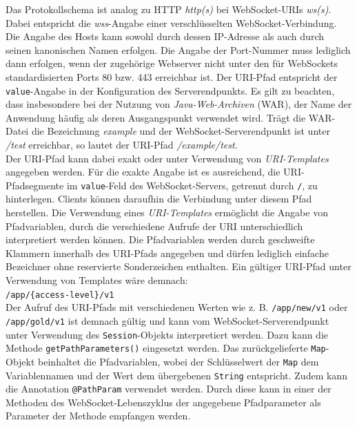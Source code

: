\documentclass[11pt,a4paper,titlepage]{scrartcl}
\numberwithin{equation}{section}
\begin{document}
\noindent Das Protokollschema ist analog zu HTTP \textit{http(s)} bei WebSocket-URIs \textit{ws(s)}. Dabei entspricht die \textit{wss}-Angabe einer verschlüsselten WebSocket-Verbindung. Die Angabe des Hosts kann sowohl durch dessen IP-Adresse als auch durch seinen kanonischen Namen erfolgen. Die Angabe der Port-Nummer muss lediglich dann erfolgen, wenn der zugehörige Webserver nicht unter den für WebSockets standardisierten Ports 80 bzw. 443 erreichbar ist. Der URI-Pfad entspricht der \texttt{value}-Angabe in der Konfiguration des Serverendpunkts. Es gilt zu beachten, dass insbesondere bei der Nutzung von \textit{Java-Web-Archiven} (WAR), der Name der Anwendung häufig als deren Ausgangspunkt verwendet wird. Trägt die WAR-Datei die Bezeichnung \textit{example} und der WebSocket-Serverendpunkt ist unter \textit{/test} erreichbar, so lautet der URI-Pfad \textit{/example/test}. \\

\noindent Der URI-Pfad kann dabei exakt oder unter Verwendung von \textit{URI-Templates} angegeben werden. Für die exakte Angabe ist es ausreichend, die URI-Pfadsegmente im \texttt{value}-Feld des WebSocket-Servers, getrennt durch \texttt{/}, zu hinterlegen. Clients können daraufhin die Verbindung unter diesem Pfad herstellen. Die Verwendung eines \textit{URI-Templates} ermöglicht die Angabe von Pfadvariablen, durch die verschiedene Aufrufe der URI unterschiedlich interpretiert werden können. Die Pfadvariablen werden durch geschweifte Klammern innerhalb des URI-Pfads angegeben und dürfen lediglich einfache Bezeichner ohne reservierte Sonderzeichen enthalten. Ein gültiger URI-Pfad unter Verwendung von Templates wäre demnach: \\

\noindent\texttt{/app/\{access-level\}/v1}\\

\noindent Der Aufruf des URI-Pfads mit verschiedenen Werten wie z. B. \texttt{/app/new/v1} oder \texttt{/app/gold/v1} ist demnach gültig und kann vom WebSocket-Serverendpunkt unter Verwendung des \texttt{Session}-Objekts interpretiert werden. Dazu kann die Methode \texttt{getPathParameters()} eingesetzt werden. Das zurückgelieferte \texttt{Map}-Objekt beinhaltet die Pfadvariablen, wobei der Schlüsselwert der \texttt{Map} dem Variablennamen und der Wert dem übergebenen \texttt{String} entspricht. Zudem kann die Annotation \texttt{@PathParam} verwendet werden. Durch diese kann in einer der Methoden des WebSocket-Lebenszyklus der angegebene Pfadparameter als Parameter der Methode empfangen werden.\medskip
\end{document}
